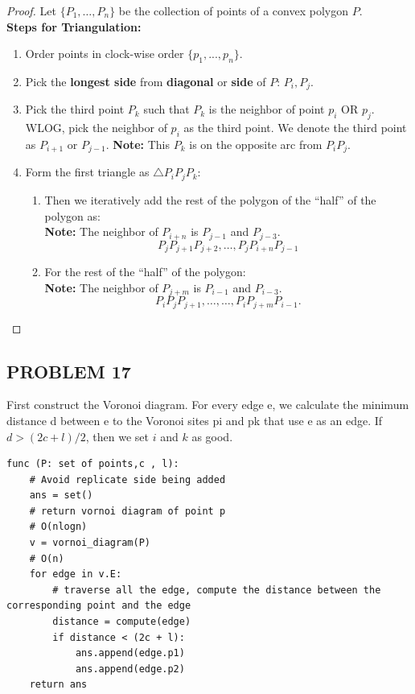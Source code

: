 \documentclass{article}
\begin{document}
\begin{proof}
    Let $\{P_1, \dots, P_n\}$ be the collection of points of a convex polygon $P$.
    \\
    \textbf{Steps for Triangulation: }

    \begin{enumerate}
        \item Order points in clock-wise order $\{p_1, ..., p_n\}$.

        \item Pick the \textbf{longest side} from \textbf{diagonal} or \textbf{side} of $P$: $P_i, P_j$.

        \item Pick the third point $P_k$ such that $P_k$ is the neighbor of point $p_i$ OR $p_j$. WLOG, 
        pick the neighbor of $p_i$ as the third point. We denote the third point as $P_{i+1}$ or $P_{j-1}$.
        \textbf{Note:} This $P_k$ is on the opposite arc from $P_i P_j$.
        \item Form the first triangle as $\triangle P_i P_j P_k$:
        \begin{enumerate}
            \item Then we iteratively add the rest of the polygon of the ``half'' of the polygon as:
            \\
            \textbf{Note:} The neighbor of $P_{i + n}$ is $P_{j - 1}$ and $P_{j - 3}$.
            \[
                P_j P_{j+1} P_{j+2}, \dots, P_{j} P_{i + n} P_{j-1}
            \]

            \item For the rest of the ``half'' of the polygon:
            \\
            \textbf{Note:} The neighbor of $P_{j + m}$ is $P_{i - 1}$ and $P_{i - 3}$.
            \[
                P_i P_j P_{j+1}, \dots, \dots, P_{i} P_{j + m} P_{i-1}.
            \]
        \end{enumerate}
\end{enumerate}

\end{proof}

\subsection*{PROBLEM 17}
First construct the Voronoi diagram. For every edge e, we calculate the minimum distance d between e to the Voronoi sites pi and pk that use e as an edge. If $d > (2c + l) / 2$, then we set $i$ and $k$ as good.
\\
\begin{verbatim}
func (P: set of points,c , l):
    # Avoid replicate side being added
    ans = set()
    # return vornoi diagram of point p
    # O(nlogn)
    v = vornoi_diagram(P)
    # O(n)
    for edge in v.E:
        # traverse all the edge, compute the distance between the corresponding point and the edge
        distance = compute(edge) 
        if distance < (2c + l):
            ans.append(edge.p1)
            ans.append(edge.p2)
    return ans
\end{verbatim}
\end{document}

